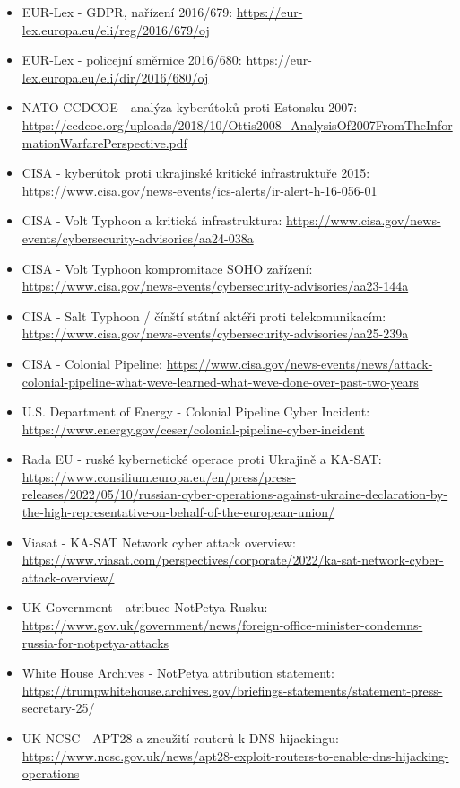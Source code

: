 \documentclass[11pt,a4paper]{article}
\begin{document}
\begin{itemize}
  \item EUR-Lex - GDPR, nařízení 2016/679: \url{https://eur-lex.europa.eu/eli/reg/2016/679/oj}
  \item EUR-Lex - policejní směrnice 2016/680: \url{https://eur-lex.europa.eu/eli/dir/2016/680/oj}
  \item NATO CCDCOE - analýza kyberútoků proti Estonsku 2007: \url{https://ccdcoe.org/uploads/2018/10/Ottis2008_AnalysisOf2007FromTheInformationWarfarePerspective.pdf}
  \item CISA - kyberútok proti ukrajinské kritické infrastruktuře 2015: \url{https://www.cisa.gov/news-events/ics-alerts/ir-alert-h-16-056-01}
  \item CISA - Volt Typhoon a kritická infrastruktura: \url{https://www.cisa.gov/news-events/cybersecurity-advisories/aa24-038a}
  \item CISA - Volt Typhoon kompromitace SOHO zařízení: \url{https://www.cisa.gov/news-events/cybersecurity-advisories/aa23-144a}
  \item CISA - Salt Typhoon / čínští státní aktéři proti telekomunikacím: \url{https://www.cisa.gov/news-events/cybersecurity-advisories/aa25-239a}
  \item CISA - Colonial Pipeline: \url{https://www.cisa.gov/news-events/news/attack-colonial-pipeline-what-weve-learned-what-weve-done-over-past-two-years}
  \item U.S. Department of Energy - Colonial Pipeline Cyber Incident: \url{https://www.energy.gov/ceser/colonial-pipeline-cyber-incident}
  \item Rada EU - ruské kybernetické operace proti Ukrajině a KA-SAT: \url{https://www.consilium.europa.eu/en/press/press-releases/2022/05/10/russian-cyber-operations-against-ukraine-declaration-by-the-high-representative-on-behalf-of-the-european-union/}
  \item Viasat - KA-SAT Network cyber attack overview: \url{https://www.viasat.com/perspectives/corporate/2022/ka-sat-network-cyber-attack-overview/}
  \item UK Government - atribuce NotPetya Rusku: \url{https://www.gov.uk/government/news/foreign-office-minister-condemns-russia-for-notpetya-attacks}
  \item White House Archives - NotPetya attribution statement: \url{https://trumpwhitehouse.archives.gov/briefings-statements/statement-press-secretary-25/}
  \item UK NCSC - APT28 a zneužití routerů k DNS hijackingu: \url{https://www.ncsc.gov.uk/news/apt28-exploit-routers-to-enable-dns-hijacking-operations}

\end{itemize}
\end{document}
